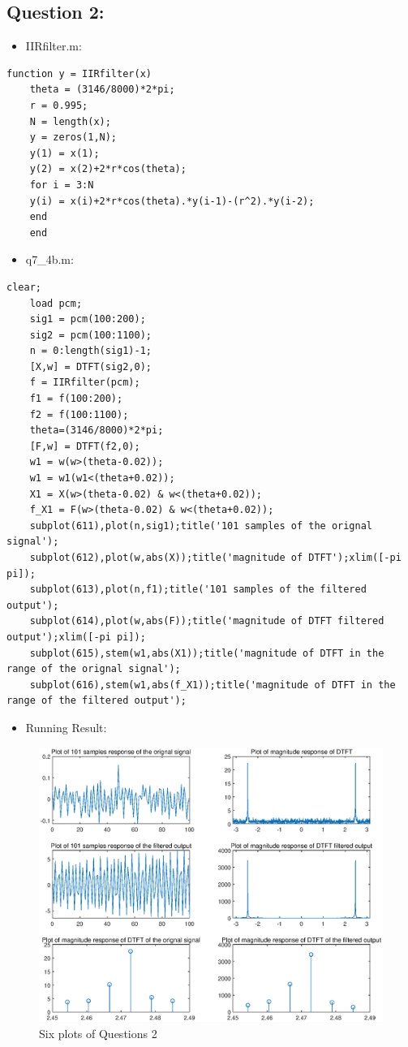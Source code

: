 \documentclass[onecolumn,oneside]{SUSTechHomework}
\begin{document}
\subsection*{Question 2:}
\begin{itemize}
	\item IIRfilter.m:
\end{itemize}
\begin{lstlisting}[title=IIRfilter.m]
	function y = IIRfilter(x)
	theta = (3146/8000)*2*pi;
	r = 0.995;
	N = length(x);
	y = zeros(1,N);
	y(1) = x(1);
	y(2) = x(2)+2*r*cos(theta);
	for i = 3:N
	y(i) = x(i)+2*r*cos(theta).*y(i-1)-(r^2).*y(i-2);
	end
	end
\end{lstlisting}
\begin{itemize}
	\item q7\_4b.m:
\end{itemize}
\begin{lstlisting}[title=q7\_4b.m]
	clear;
	load pcm;
	sig1 = pcm(100:200);
	sig2 = pcm(100:1100);
	n = 0:length(sig1)-1;
	[X,w] = DTFT(sig2,0);
	f = IIRfilter(pcm);
	f1 = f(100:200);
	f2 = f(100:1100);
	theta=(3146/8000)*2*pi;
	[F,w] = DTFT(f2,0);
	w1 = w(w>(theta-0.02));
	w1 = w1(w1<(theta+0.02));
	X1 = X(w>(theta-0.02) & w<(theta+0.02));
	f_X1 = F(w>(theta-0.02) & w<(theta+0.02));
	subplot(611),plot(n,sig1);title('101 samples of the orignal signal');
	subplot(612),plot(w,abs(X));title('magnitude of DTFT');xlim([-pi pi]);
	subplot(613),plot(n,f1);title('101 samples of the filtered output');
	subplot(614),plot(w,abs(F));title('magnitude of DTFT filtered output');xlim([-pi pi]);
	subplot(615),stem(w1,abs(X1));title('magnitude of DTFT in the range of the orignal signal');
	subplot(616),stem(w1,abs(f_X1));title('magnitude of DTFT in the range of the filtered output');
\end{lstlisting}
\begin{itemize}
	\item Running Result:
\end{itemize}
\begin{figure}[H]
	\centering
	\includegraphics[width=170mm]{pictures/7.4b.eps}
	\caption{Six plots of Questions 2}
\end{figure}
\end{document}
